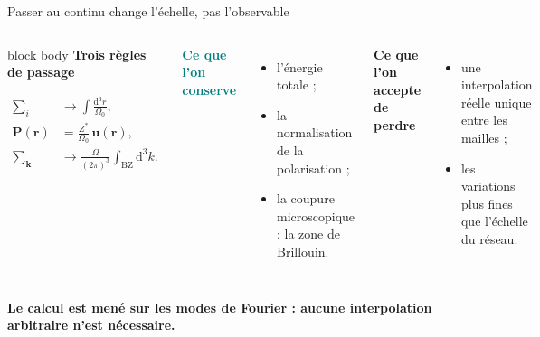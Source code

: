 \documentclass[aspectratio=169,10pt,t]{beamer}
\newcommand{\tagline}[2]{\textcolor{#1}{\bfseries #2}}
\begin{document}
\begin{frame}{Passer au continu change l'échelle, pas l'observable}
  \begin{columns}[T,onlytextwidth]
      \begin{beamercolorbox}[rounded=true,sep=0.40em]{block body}
        \centering
        {\bfseries\color{DeepNavy}Trois règles de passage}\par
        \vspace{0.05cm}
        \[
          \begin{aligned}
          \sum_i &\longrightarrow \int\!\frac{\mathrm d^3r}{\Omega_0},\\[0.16cm]
          \bm P(\bm r)&=\frac{Z^*}{\Omega_0}\,\bm u(\bm r),\\[0.16cm]
          \sum_{\bm k}&\longrightarrow
          \frac{\Omega}{(2\pi)^3}\int_{\mathrm{BZ}}\!\mathrm d^3k.
          \end{aligned}
        \]
      \end{beamercolorbox}
      \tagline{Teal}{Ce que l'on conserve}\par
      \begin{itemize}\setlength\itemsep{0.15cm}
        \item l'énergie totale ;
        \item la normalisation de la polarisation ;
        \item la coupure microscopique : la zone de Brillouin.
      \end{itemize}
      \vspace{0.14cm}
      \tagline{CSOrange}{Ce que l'on accepte de perdre}\par
      \begin{itemize}\setlength\itemsep{0.15cm}
        \item une interpolation réelle unique entre les mailles ;
        \item les variations plus fines que l'échelle du réseau.
      \end{itemize}
  \end{columns}
  \vspace{0cm}
  {\color{DeepNavy}\bfseries Le calcul est mené sur les modes de Fourier : aucune interpolation arbitraire n'est nécessaire.}
\end{frame}
\end{document}
